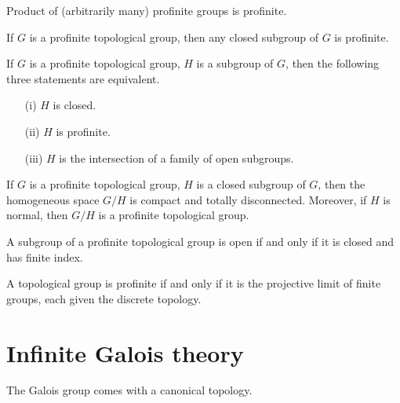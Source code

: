 \begin{lemma}
	Product of (arbitrarily many) profinite groups is profinite.
\end{lemma}

\begin{lemma}
	\leanok
	If $G$ is a profinite topological group, then any closed subgroup of $G$ is profinite.
\end{lemma}

\begin{theorem}
	If $G$ is a profinite topological group, $H$ is a subgroup of $G$, then the following three statements
	are equivalent.
	\begin{itemize}
		\item[(i)] $ H $ is closed.
		\item[(ii)] $ H $ is profinite.
		\item[(iii)] $ H $ is the intersection of a family of open subgroups.
	\end{itemize}
\end{theorem}

\begin{lemma}
	If $G$ is a profinite topological group, $H$ is a closed subgroup of $G$, then the homogeneous space $G / H$ is compact and totally disconnected. Moreover, if $H$ is normal, then $G / H$ is a profinite topological group.
\end{lemma}

\begin{lemma}
	A subgroup of a profinite topological group is open if and only if it is closed and has finite index.
\end{lemma}

\begin{theorem}
	A topological group is profinite if and only if it is the projective limit of finite groups, each given the discrete topology.
\end{theorem}



\chapter{Infinite Galois theory}
\label{section-infinite-galois}

\noindent
The Galois group comes with a canonical topology.


